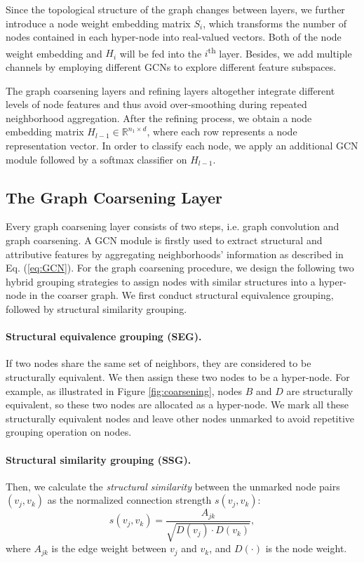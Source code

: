 \documentclass{article}
\begin{document}
Since the topological structure of the graph changes between layers, we further introduce a node weight embedding matrix $S_i$, which transforms the number of nodes contained in each hyper-node into real-valued vectors. Both of the node weight embedding and $H_i$ will be fed into the $i$\textsuperscript{th} layer. Besides, we add multiple channels by employing different GCNs to explore different feature subspaces.

The graph coarsening layers and refining layers altogether integrate different levels of node features and thus avoid over-smoothing during repeated neighborhood aggregation. After the refining process, we obtain a node embedding matrix $H_{l - 1}\in \mathbb{R}^{n_1 \times d}$, where each row represents a node representation vector. In order to classify each node, we apply an additional GCN module followed by a softmax classifier on $H_{l - 1}$.

\subsection{The Graph Coarsening Layer}

Every graph coarsening layer consists of two steps, i.e. graph convolution and graph coarsening. A GCN module is firstly used to extract structural and attributive features by aggregating neighborhoods' information as described in Eq. (\ref{eq:GCN}). For the graph coarsening procedure, we design the following two hybrid grouping strategies to assign nodes with similar structures into a hyper-node in the coarser graph. We first conduct structural equivalence grouping, followed by structural similarity grouping.

\paragraph{Structural equivalence grouping (SEG).}
If two nodes share the same set of neighbors, they are considered to be structurally equivalent. We then assign these two nodes to be a hyper-node. For example, as illustrated in Figure \ref{fig:coarsening}, nodes $B$ and $D$ are structurally equivalent, so these two nodes are allocated as a hyper-node. We mark all these structurally equivalent nodes and leave other nodes unmarked to avoid repetitive grouping operation on nodes.

\paragraph{Structural similarity grouping (SSG).}
Then, we calculate the {\it structural similarity} between the unmarked node pairs $(v_j, v_k)$ as the normalized connection strength $s(v_j, v_k)$:
\begin{equation}
	s(v_j, v_k) = \frac{A_{jk}}{\sqrt{D(v_j) \cdot D(v_k)}},
	\label{eq:normalized-connection-strength}
\end{equation}
where $A_{jk}$ is the edge weight between $v_j$ and $v_k$, and $D(\cdot)$ is the node weight.
\end{document}
